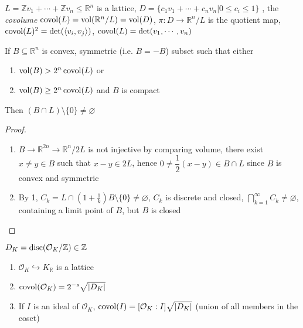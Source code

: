 \documentclass[../main.tex]{subfiles}
\begin{document}
\begin{definition}
$L=\mathbb Zv_1+\cdots+\mathbb Zv_n\leq\mathbb R^n$ is a lattice, $D=\{c_1v_1+\cdots+c_nv_n|0\leq c_i\leq1\}$ , the \textit{covolume} $\operatorname{covol}(L)=\operatorname{vol}(\mathbb R^n/L)=\operatorname{vol}(D)$, $\pi:D\to\mathbb R^n/L$ is the quotient map, $\operatorname{covol}(L)^2=\det(\langle v_i,v_j\rangle)$, $\operatorname{covol}(L)=\det(v_1,\cdots,v_n)$
\end{definition}

\begin{theorem}
If $B\subseteq\mathbb R^n$ is convex, symmetric (i.e. $B=-B$) subset such that either
\begin{enumerate}
\item $\operatorname{vol}(B)>2^n\operatorname{covol}(L)$ or
\item $\operatorname{vol}(B)\geq2^n\operatorname{covol}(L)$ and $B$ is compact
\end{enumerate}
Then $(B\cap L)\setminus\{0\}\neq\varnothing$
\end{theorem}

\begin{proof}
\begin{enumerate}
\item $B\to\mathbb R^{2n}\to\mathbb R^n/2L$ is not injective by comparing volume, there exist $x\neq y\in B$ such that $x-y\in 2L$, hence $0\neq\dfrac{1}{2}(x-y)\in B\cap L$ since $B$ is convex and symmetric
\item By 1, $C_k=L\cap(1+\frac{1}{k})B\setminus\{0\}\neq\varnothing$, $C_k$ is discrete and closed, $\displaystyle\bigcap_{k=1}^\infty C_k\neq\varnothing$, containing a limit point of $B$, but $B$ is closed
\end{enumerate}
\end{proof}

\begin{proposition}
$D_K=\operatorname{disc}(\mathcal O_K/\mathbb Z)\in\mathbb Z$
\begin{enumerate}
\item $\mathcal O_K\hookrightarrow K_{\mathbb R}$ is a lattice
\item $\operatorname{covol}(\mathcal O_K)=2^{-s}\sqrt{|D_K|}$
\item If $I$ is an ideal of $\mathcal O_K$, $\operatorname{covol}(I)=[\mathcal O_K:I]\sqrt{|D_K|}$ (union of all members in the coset)
\end{enumerate}
\end{proposition}
\end{document}
